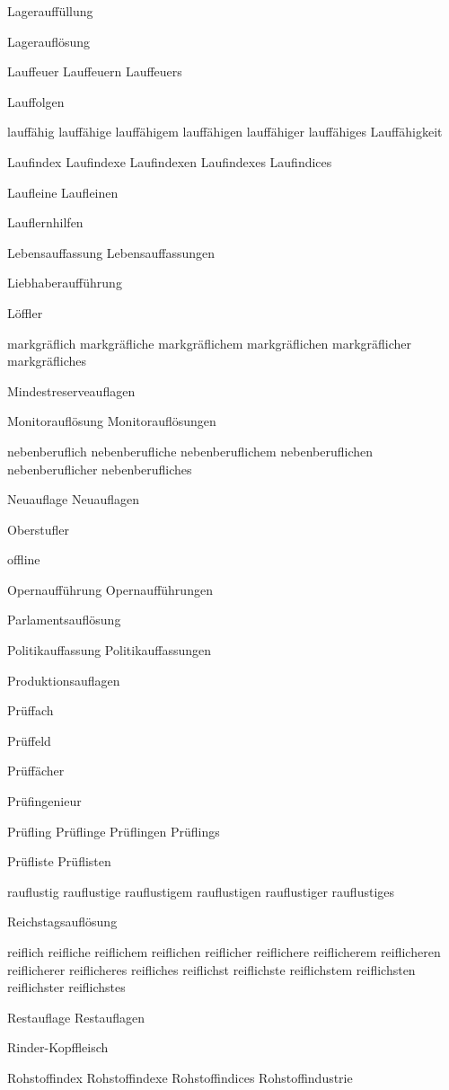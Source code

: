 Lagerauffüllung

Lagerauflösung

Lauffeuer Lauffeuern Lauffeuers

Lauffolgen

lauffähig lauffähige lauffähigem lauffähigen lauffähiger lauffähiges Lauffähigkeit

Laufindex Laufindexe Laufindexen Laufindexes Laufindices

Laufleine Laufleinen

Lauflernhilfen

Lebensauffassung Lebensauffassungen

Liebhaberaufführung 

Löffler

markgräflich markgräfliche markgräflichem markgräflichen markgräflicher markgräfliches

Mindestreserveauflagen

Monitorauflösung Monitorauflösungen

nebenberuflich nebenberufliche nebenberuflichem nebenberuflichen nebenberuflicher nebenberufliches

Neuauflage Neuauflagen

Oberstufler

offline

Opernaufführung Opernaufführungen

Parlamentsauflösung

Politikauffassung Politikauffassungen

Produktionsauflagen

Prüffach 

Prüffeld

Prüffächer

Prüfingenieur

Prüfling Prüflinge Prüflingen Prüflings

Prüfliste Prüflisten

rauflustig rauflustige rauflustigem rauflustigen rauflustiger rauflustiges

Reichstagsauflösung

reiflich reifliche reiflichem reiflichen reiflicher reiflichere reiflicherem reiflicheren reiflicherer reiflicheres reifliches reiflichst reiflichste reiflichstem reiflichsten reiflichster reiflichstes

Restauflage Restauflagen

Rinder-Kopffleisch

Rohstoffindex Rohstoffindexe Rohstoffindices Rohstoffindustrie

